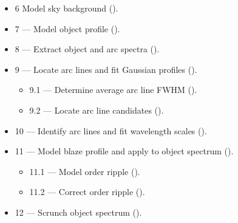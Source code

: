 \begin{itemize}
\item {6 \sunspec{---}{-} Model sky background
      ().}

\item {7 --- Model object profile
      ().}

\item {8 --- Extract object and arc spectra
      ().}

\item {9 --- Locate arc lines and fit Gaussian profiles
      ().}

\begin{itemize}

   \item {9.1 --- Determine average arc line FWHM
         ().}

   \item {9.2 --- Locate arc line candidates
         ().}

\end{itemize}

\item {10 --- Identify arc lines and fit wavelength scales
      ().}

\item {11 --- Model blaze profile and apply to object spectrum
      ().}

\begin {itemize}

   \item {11.1 --- Model order ripple
         ().}

   \item {11.2 --- Correct order ripple
         ().}

\end{itemize}

\item {12 --- Scrunch object spectrum
      ().}

\begin{itemize}


\end{itemize}
\end{itemize}
